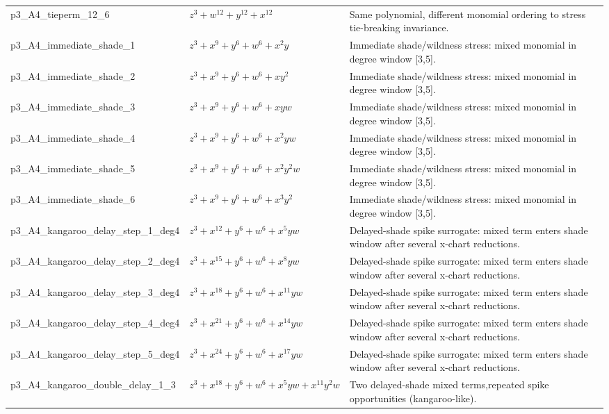 \documentclass[11pt]{amsart}
\begin{document}
\begin{longtable}{@{}p{} p{} p{}@{}}
p3\_A4\_tieperm\_12\_6 & $z^{3} + w^{12} + y^{12} + x^{12}$ & Same polynomial, different monomial ordering to stress tie-breaking invariance. \\
p3\_A4\_immediate\_shade\_1 & $z^{3} + x^{9} + y^{6} + w^{6} + x^{2}y$ & Immediate shade/wildness stress: mixed monomial in degree window [3,5]. \\
p3\_A4\_immediate\_shade\_2 & $z^{3} + x^{9} + y^{6} + w^{6} + xy^{2}$ & Immediate shade/wildness stress: mixed monomial in degree window [3,5]. \\
p3\_A4\_immediate\_shade\_3 & $z^{3} + x^{9} + y^{6} + w^{6} + xyw$ & Immediate shade/wildness stress: mixed monomial in degree window [3,5]. \\
p3\_A4\_immediate\_shade\_4 & $z^{3} + x^{9} + y^{6} + w^{6} + x^{2}yw$ & Immediate shade/wildness stress: mixed monomial in degree window [3,5]. \\
p3\_A4\_immediate\_shade\_5 & $z^{3} + x^{9} + y^{6} + w^{6} + x^{2}y^{2}w$ & Immediate shade/wildness stress: mixed monomial in degree window [3,5]. \\
p3\_A4\_immediate\_shade\_6 & $z^{3} + x^{9} + y^{6} + w^{6} + x^{3}y^{2}$ & Immediate shade/wildness stress: mixed monomial in degree window [3,5]. \\
p3\_A4\_kangaroo\_delay\_step\_1\_deg4 & $z^{3} + x^{12} + y^{6} + w^{6} + x^{5}yw$ & Delayed-shade spike surrogate: mixed term enters shade window after several x-chart reductions. \\
p3\_A4\_kangaroo\_delay\_step\_2\_deg4 & $z^{3} + x^{15} + y^{6} + w^{6} + x^{8}yw$ & Delayed-shade spike surrogate: mixed term enters shade window after several x-chart reductions. \\
p3\_A4\_kangaroo\_delay\_step\_3\_deg4 & $z^{3} + x^{18} + y^{6} + w^{6} + x^{11}yw$ & Delayed-shade spike surrogate: mixed term enters shade window after several x-chart reductions. \\
p3\_A4\_kangaroo\_delay\_step\_4\_deg4 & $z^{3} + x^{21} + y^{6} + w^{6} + x^{14}yw$ & Delayed-shade spike surrogate: mixed term enters shade window after several x-chart reductions. \\
p3\_A4\_kangaroo\_delay\_step\_5\_deg4 & $z^{3} + x^{24} + y^{6} + w^{6} + x^{17}yw$ & Delayed-shade spike surrogate: mixed term enters shade window after several x-chart reductions. \\
p3\_A4\_kangaroo\_double\_delay\_1\_3 & $z^{3} + x^{18} + y^{6} + w^{6} + x^{5}yw + x^{11}y^{2}w$ & Two delayed-shade mixed terms,repeated spike opportunities (kangaroo-like). \\

\end{longtable}
\end{document}
